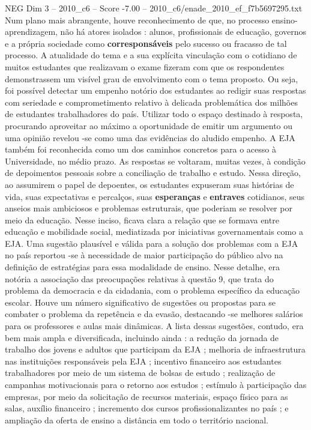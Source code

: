 \begin{textsample}{NEG Dim 3 – 2010\_c6 – Score -7.00 – 2010\_c6/enade\_2010\_ef\_f7b5697295.txt}
Num plano mais abrangente, houve reconhecimento de que, no processo ensino-aprendizagem, não há atores isolados : alunos, profissionais de educação, governos e a própria sociedade como \textbf{corresponsáveis} pelo sucesso ou fracasso de tal processo.
A atualidade do tema e a sua explícita vinculação com o cotidiano de muitos estudantes que realizavam o exame fizeram com que os respondentes demonstrassem um visível grau de envolvimento com o tema proposto.
Ou seja, foi possível detectar um empenho notório dos estudantes ao redigir suas respostas com seriedade e comprometimento relativo à delicada problemática dos milhões de estudantes trabalhadores do país.
Utilizar todo o espaço destinado à resposta, procurando aproveitar ao máximo a oportunidade de emitir um argumento ou uma opinião revelou -se como uma das evidências do aludido empenho.
A EJA também foi reconhecida como um dos caminhos concretos para o acesso à Universidade, no médio prazo.
As respostas se voltaram, muitas vezes, à condição de depoimentos pessoais sobre a conciliação de trabalho e estudo.
Nessa direção, ao assumirem o papel de depoentes, os estudantes expuseram suas histórias de vida, suas expectativas e percalços, suas \textbf{esperanças} e \textbf{entraves} cotidianos, seus anseios mais ambiciosos e problemas estruturais, que poderiam se resolver por meio da educação.
Nesse inciso, ficava clara a relação que se formava entre educação e mobilidade social, mediatizada por iniciativas governamentais como a EJA.
Uma sugestão plausível e válida para a solução dos problemas com a EJA no país reportou -se à necessidade de maior participação do público alvo na definição de estratégias para essa modalidade de ensino.
Nesse detalhe, era notória a associação das preocupações relativas à questão 9, que trata do problema da democracia e da cidadania, com o problema específico da educação escolar.
Houve um número significativo de sugestões ou propostas para se combater o problema da repetência e da evasão, destacando -se melhores salários para os professores e aulas mais dinâmicas.
A lista dessas sugestões, contudo, era bem mais ampla e diversificada, incluindo ainda : a redução da jornada de trabalho dos jovens e adultos que participam da EJA ; melhoria de infraestrutura nas instituições responsáveis pela EJA ; incentivo financeiro aos estudantes trabalhadores por meio de um sistema de bolsas de estudo ; realização de campanhas motivacionais para o retorno aos estudos ; estímulo à participação das empresas, por meio da solicitação de recursos materiais, espaço físico para as salas, auxílio financeiro ; incremento dos cursos profissionalizantes no país ; e ampliação da oferta de ensino a distância em todo o território nacional.

\end{textsample}

